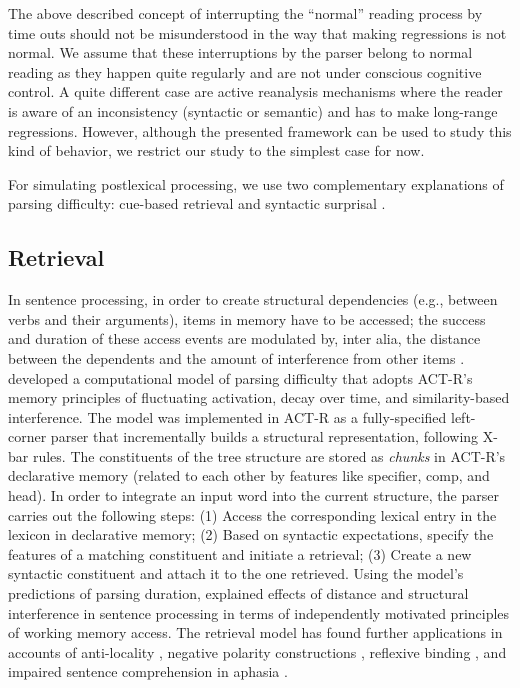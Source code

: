 The above described concept of interrupting the ``normal'' reading process by time outs should not be misunderstood in the way that making regressions is not normal.  We assume that these interruptions by the parser belong to normal reading as they happen quite regularly and are not under conscious cognitive control.  A quite different case are active reanalysis mechanisms where the reader is aware of an inconsistency (syntactic or semantic) and has to make long-range regressions.  However, although the presented framework can be used to study this kind of behavior, we restrict our study to the simplest case for now.

For simulating postlexical processing, we use two complementary explanations of parsing difficulty: cue-based retrieval \citep{LewisVasishth2005} and  syntactic surprisal \citep{Hale2001,Levy2008}. 

\subsection{Retrieval}
In sentence processing, in order to create structural dependencies (e.g., between verbs and their arguments), items in memory have to be accessed; the success and duration of these access events are modulated by, inter alia, the distance between the dependents and the amount of interference from other items \citep{Just1980,JustCarpenter1992,Gibson2000,grodner,Bartek2011}.
\cite{LewisVasishth2005} developed a computational model of parsing difficulty that adopts ACT-R's memory principles of fluctuating activation, decay over time, and similarity-based interference.  The model was implemented in ACT-R as a fully-specified left-corner parser that incrementally builds a structural representation, following X-bar rules. The constituents of the tree structure are stored as \emph{chunks} in ACT-R's declarative memory (related to each other by features like specifier, comp, and head).  In order to integrate an input word into the current structure, the parser carries out the following steps: (1) Access the corresponding lexical entry in the lexicon in declarative memory; (2) Based on syntactic expectations, specify the features of a matching constituent and initiate a retrieval; (3) Create a new syntactic constituent and attach it to the one retrieved.
Using the model's predictions of parsing duration, \cite{LewisVasishth2005} explained effects of distance and structural interference in sentence processing in terms of independently motivated principles of working memory access.  The retrieval model has found further applications in accounts of anti-locality \citep{VasishthLewis2006}, negative polarity constructions \citep{VasishthBruessowLewis2008}, reflexive binding \citep{PatilVasishthLewis2016}, and impaired sentence comprehension in aphasia \citep{PatilEtAl2016}.


